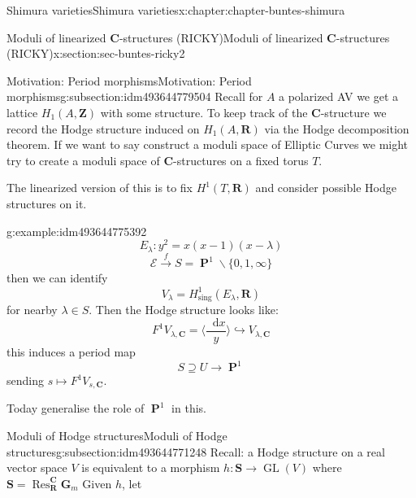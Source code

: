 \documentclass[oneside,10pt,]{book}
\numberwithin{equation}{section}
\newcommand{\diff}{\mathop{}\!\mathrm{d}}
\newcommand{\ZZ}{\mathbf{Z}}
\newcommand{\RR}{\mathbf{R}}
\newcommand{\CC}{\mathbf{C}}
\newcommand{\sing}{\mathrm{sing}}
\DeclareMathOperator{\Res}{Res}
\DeclareMathOperator{\PP}{\mathbf{P}}
\DeclareMathOperator{\GL}{GL}
\begin{document}
\begin{chapterptx}{Shimura varieties}{}{Shimura varieties}{}{}{x:chapter:chapter-buntes-shimura}
\begin{sectionptx}{Moduli of linearized \(\CC\)-structures (RICKY)}{}{Moduli of linearized \(\CC\)-structures (RICKY)}{}{}{x:section:sec-buntes-ricky2}
%
%
\typeout{************************************************}
\typeout{************************************************}
%
\begin{subsectionptx}{Motivation: Period morphisms}{}{Motivation: Period morphisms}{}{}{g:subsection:idm493644779504}
Recall for  \(A\) a  polarized AV we get a lattice \(H_1(A,\ZZ)\) with some structure. To keep track of the \(\CC\)-structure  we record the Hodge structure induced on \(H_1(A,\RR)\) via the Hodge decomposition theorem. If we want to say construct a moduli space of Elliptic Curves we might try to create a moduli space of \(\CC\)-structures on a fixed torus \(T\).%
\par
The linearized version of this is to fix \(H^1(T, \RR)\) and consider possible Hodge structures on it.%
\begin{example}{}{g:example:idm493644775392}%
%
\begin{equation*}
E_\lambda \colon y^2 = x(x-1) (x-\lambda)
\end{equation*}
%
\begin{equation*}
\mathcal E \xrightarrow f S = \PP^1 \smallsetminus \{0,1,\infty\}
\end{equation*}
then we can identify%
\begin{equation*}
V_\lambda = H^1_\sing(E_\lambda, \RR)
\end{equation*}
for nearby \(\lambda \in S\). Then the Hodge structure looks like:%
\begin{equation*}
F^1 V_{\lambda, \CC} = \langle \frac{\diff x}{y} \rangle \hookrightarrow V_{\lambda, \CC}
\end{equation*}
this induces a period map%
\begin{equation*}
S\supseteq U \to \PP^1
\end{equation*}
sending \(s \mapsto F^1V_{s, \CC}\).%
\end{example}
Today generalise the role of \(\PP^1\) in this.%
\end{subsectionptx}
%
%
\typeout{************************************************}
\typeout{************************************************}
%
\begin{subsectionptx}{Moduli of Hodge structures}{}{Moduli of Hodge structures}{}{}{g:subsection:idm493644771248}
Recall: a Hodge structure on a real vector space \(V\) is equivalent to a morphism \(h \colon \mathbf S \to \GL(V)\) where \(\mathbf S  = \Res_\RR^\CC \mathbf G_m\) Given \(h\), let%

\end{subsectionptx}
\end{sectionptx}
\end{chapterptx}
\end{document}
